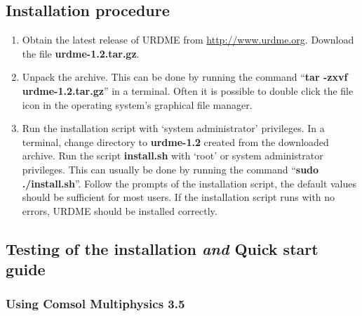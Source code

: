 \subsection{Installation procedure}

\begin{enumerate}
\item Obtain the latest release of URDME from
  \url{http://www.urdme.org}. Download the file {\bf urdme-1.2.tar.gz}. 
\item Unpack the archive. This can be done by running the command
  ``{\bf tar -zxvf urdme-1.2.tar.gz}'' in a terminal. Often it is
  possible to double click the file icon in the operating system's
  graphical file manager.
\item Run the installation script with `system administrator'
  privileges. In a terminal, change directory to {\bf urdme-1.2}
  created from the downloaded archive. Run the script {\bf install.sh}
  with `root' or system administrator privileges. This can usually be
  done by running the command ``{\bf sudo ./install.sh}''. Follow the
  prompts of the installation script, the default values should be
  sufficient for most users. If the installation script runs with no
  errors, URDME should be installed correctly.
\end{enumerate}

\subsection{Testing of the installation {\it and} Quick start guide}
\label{sec:quickstart}

\subsubsection{Using Comsol Multiphysics 3.5}

